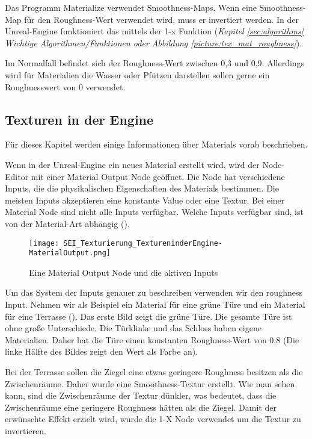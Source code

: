 {Das Programm Materialize verwendet Smoothness-Maps. Wenn eine Smoothness-Map für den Roughness-Wert verwendet wird,
muss er invertiert werden. In der Unreal-Engine funktioniert das mittels der 1-x Funktion
(\textit{Kapitel \ref{sec:algorithms} Wichtige Algorithmen/Funktionen oder Abbildung \ref{picture:tex_mat_roughness}}).

Im Normalfall befindet sich der Roughness-Wert zwischen 0,3 und 0,9. Allerdings wird für Materialien die Wasser oder
Pfützen darstellen sollen gerne ein Roughnesswert von 0 verwendet.

\subsection{Texturen in der Engine}
\label{sec:tex_inside_engine}

Für dieses Kapitel werden einige Informationen über Materials vorab beschrieben.


Wenn in der Unreal-Engine ein neues Material erstellt wird, wird der Node-Editor\citep{ue:node_introduction} mit einer
Material Output Node geöffnet. Die Node hat verschiedene Inputs, die die physikalischen Eigenschaften des Materials
bestimmen. Die meisten Inputs akzeptieren eine konstante Value oder eine Textur. Bei einer Material Node sind nicht
alle Inputs verfügbar. Welche Inputs verfügbar sind, ist von der Material-Art abhängig
().

\begin{figure}[H]
\centering
\texttt{[image: SEI\_Texturierung\_TextureninderEngine-MaterialOutput.png]}
\caption{Eine Material Output Node und die aktiven Inputs}
\label{picture:mat_ue4_node}
\end{figure}


Um das System der Inputs genauer zu beschreiben verwenden wir den roughness Input. Nehmen wir als Beispiel ein Material
für eine grüne Türe und ein Material für eine Terrasse ().
Das erste Bild zeigt die grüne Türe. Die gesamte Türe ist ohne große Unterschiede. Die Türklinke und das Schloss haben
eigene Materialien. Daher hat die Türe einen konstanten Roughness-Wert von 0,8 (Die linke Hälfte des Bildes zeigt
den Wert als Farbe an).

Bei der Terrasse sollen die Ziegel eine etwas geringere Roughness besitzen als die Zwischenräume. Daher wurde eine
Smoothness-Textur erstellt. Wie man sehen kann, sind die Zwischenräume der Textur dünkler, was bedeutet, dass die
Zwischenräume eine geringere Roughness hätten als die Ziegel. Damit der erwünschte Effekt erzielt wird, wurde die
1-X Node verwendet um die Textur zu invertieren.

}
